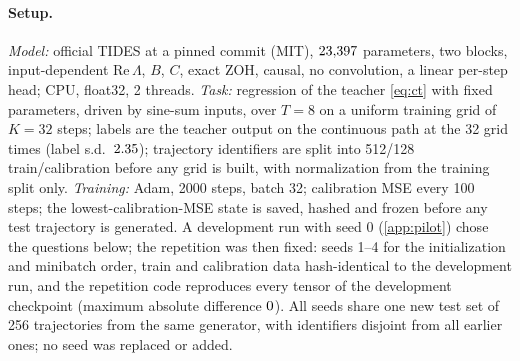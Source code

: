 \documentclass{article}
\theoremstyle{plain}
\theoremstyle{definition}
\theoremstyle{remark}
\begin{document}
\paragraph{Setup.}
\emph{Model:} official TIDES at a pinned commit (MIT), $23{,}397$ parameters, two blocks, input-dependent $\mathrm{Re}\,\Lambda$, $B$, $C$, exact ZOH, causal, no convolution, a linear per-step head; CPU, float32, 2 threads.
\emph{Task:} regression of the teacher \eqref{eq:ct} with fixed parameters, driven by sine-sum inputs, over $T{=}8$ on a uniform training grid of $K{=}32$ steps; labels are the teacher output on the continuous path at the 32 grid times (label s.d.\ $2.35$); trajectory identifiers are split into 512/128 train/calibration before any grid is built, with normalization from the training split only.
\emph{Training:} Adam, 2000 steps, batch 32; calibration MSE every 100 steps; the lowest-calibration-MSE state is saved, hashed and frozen before any test trajectory is generated.
A development run with seed 0 (\cref{app:pilot}) chose the questions below; the repetition was then fixed: seeds 1--4 for the initialization and minibatch order, train and calibration data hash-identical to the development run, and the repetition code reproduces every tensor of the development checkpoint (maximum absolute difference $0$).
All seeds share one new test set of 256 trajectories from the same generator, with identifiers disjoint from all earlier ones; no seed was replaced or added.
\end{document}
